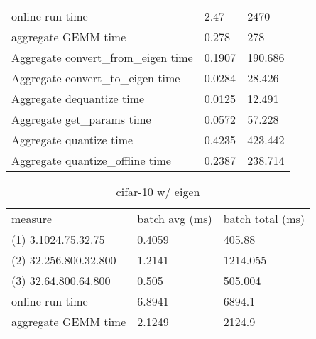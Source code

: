 \begin{longtable}{lll}
online run time                           & 2.47           & 2470             \\
aggregate GEMM time                       & 0.278          & 278              \\
Aggregate convert\_from\_eigen time       & 0.1907         & 190.686          \\
Aggregate convert\_to\_eigen time         & 0.0284         & 28.426           \\
Aggregate dequantize time                 & 0.0125         & 12.491           \\
Aggregate get\_params time                & 0.0572         & 57.228           \\
Aggregate quantize time                   & 0.4235         & 423.442          \\
Aggregate quantize\_offline time          & 0.2387         & 238.714         
\end{longtable}

\begin{longtable}{lll}
\caption{cifar-10 w/ eigen}\\
measure               & batch avg (ms) & batch total (ms) \\
(1) 3.1024.75.32.75   & 0.4059         & 405.88           \\
(2) 32.256.800.32.800 & 1.2141         & 1214.055         \\
(3) 32.64.800.64.800  & 0.505          & 505.004          \\
online run time       & 6.8941         & 6894.1           \\
aggregate GEMM time   & 2.1249         & 2124.9          
\end{longtable}

